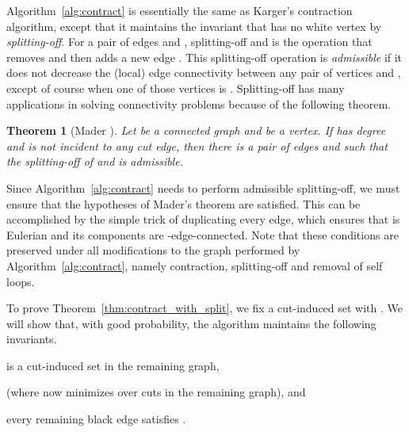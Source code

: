 \documentclass[11pt]{article}
\numberwithin{equation}{section}
\newtheorem{theorem}{Theorem}[section]
\newcommand{\newterm}[1]{\textit{#1}}
\newcommand{\Algorithm}[1]{Algorithm~\ref{alg:#1}}
\newcommand{\TheoremName}[1]{\label{thm:#1}}
\newcommand{\Theorem}[1]{Theorem~\ref{thm:#1}}
\begin{document}
\Algorithm{contract} is essentially the same as Karger's contraction algorithm,
except that it maintains the invariant that  has no white vertex by \newterm{splitting-off}.
For a pair of edges  and , splitting-off  and 
is the operation that removes  and  then adds a new edge .
This splitting-off operation is \newterm{admissible} 
if it does not decrease the (local) edge connectivity
between any pair of vertices  and , except of course when one of those vertices is .
Splitting-off has many applications in solving connectivity problems
because of the following theorem.

\begin{theorem}[Mader \protect\cite{Mader}]
\TheoremName{mader}
Let  be a connected graph and  be a vertex.
If  has degree  and  is not incident to any cut edge,
then there is a pair of edges  and  such that
the splitting-off of  and  is admissible.
\end{theorem}


Since \Algorithm{contract} needs to perform admissible splitting-off,
we must ensure that the hypotheses of Mader's theorem are satisfied.
This can be accomplished by the simple trick of duplicating every edge,
which ensures that  is Eulerian and its components are -edge-connected.
Note that these conditions are preserved under
all modifications to the graph performed by \Algorithm{contract},
namely contraction, splitting-off and removal of self loops.


\newenvironment{invariants}{
    \begin{list}{(I\textrm{\arabic{itemctr}}): }{
        \usecounter{itemctr}
        \setlength{\itemindent}{0pt}
        \setlength{\labelwidth}{24pt}
        \setlength{\labelsep}{9pt}
        \setlength{\leftmargin}{\parindent+\labelwidth+\labelsep}
        \setlength{\itemsep}{3pt}
        \setlength{\topsep}{6pt}
        \setlength{\listparindent}{0pt}
    }
}
{
    \end{list}
}

To prove \Theorem{contract_with_split},
we fix a cut-induced set  with .
We will show that, with good probability,
the algorithm maintains the following invariants.
\begin{invariants}
\item  is a cut-induced set in the remaining graph,
\item  (where  now minimizes over cuts in the remaining graph), and
\item every remaining black edge  satisfies .
\end{invariants}
\end{document}
